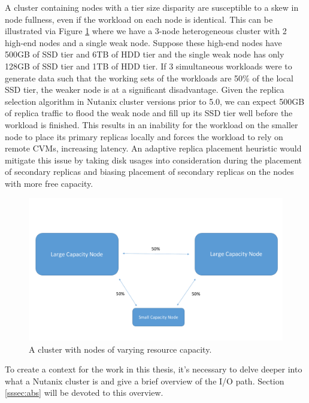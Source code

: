 \documentclass[12pt]{article}
\begin{document}
    A cluster containing nodes with a tier size disparity are susceptible to a
    skew in node fullness, even if the workload on each node is identical. This
    can be illustrated via Figure \ref{fig:tier_size_disparity} where we have a
    3-node heterogeneous cluster with 2 high-end nodes and a single weak node.
    Suppose these high-end nodes have 500GB of SSD tier and 6TB of HDD tier and
    the single weak node has only 128GB of SSD tier and 1TB of HDD tier. If 3
    simultaneous workloads were to generate data such that the working sets of
    the workloads are 50\% of the local SSD tier, the weaker node is at a
    significant disadvantage. Given the replica selection algorithm in Nutanix
    cluster versions prior to 5.0, we can expect 500GB of replica traffic to
    flood the weak node and fill up its SSD tier well before the workload is
    finished.  This results in an inability for the workload on the smaller
    node to place its primary replicas locally and forces the workload to rely
    on remote CVMs, increasing latency. An adaptive replica placement heuristic
    would mitigate this issue by taking disk usages into consideration during
    the placement of secondary replicas and biasing placement of secondary
    replicas on the nodes with more free capacity.

    \begin{figure}[htbp]
      \centering
      \includegraphics[scale=0.45]{images/homogeneous_tier_disparity.pdf} 
      \caption{A cluster with nodes of varying resource capacity.}
      \label{fig:tier_size_disparity}
    \end{figure}

    To create a context for the work in this thesis, it's necessary to delve
    deeper into what a Nutanix cluster is and give a brief overview of the
    I/O path. Section \ref{sssec:abs} will be devoted to this overview.
\end{document}
